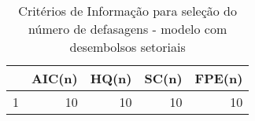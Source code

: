 \begin{table}[!htb]
\centering
\caption{Crit\'{e}rios de Informa\c{c}\~{a}o para sele\c{c}\~{a}o do n\'{u}mero de defasagens - modelo com desembolsos setoriais} 
\label{tab:lagselectionm-2}
\begin{tabular}{lrrrr}
  \toprule
 & AIC(n) & HQ(n) & SC(n) & FPE(n) \\ 
  \midrule
1 &  10 &  10 &  10 &  10 \\ 
   \bottomrule
\end{tabular}
\end{table}
